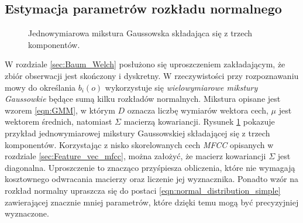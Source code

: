 \documentclass[shortabstract, mgr]{iithesis}
\begin{document}
	   \subsection{Estymacja parametrów rozkładu normalnego}
	   	   
	   \begin{figure}[H]
		   \centering
		   \label{fig:gmm}
		   \caption{Jednowymiarowa mikstura Gaussowska składająca się z trzech komponentów.}
	\end{figure}
	   
	   \label{sec:gmm_estimation}
	   W rozdziale \ref{sec:Baum_Welch} posłużono się uproszczeniem zakładającym, że zbiór obserwacji jest skończony i dyskretny. W rzeczywistości przy rozpoznawaniu mowy do określania $b_i(o)$ wykorzystuje się \textit{wielowymiarowe mikstury Gaussowkie} będące sumą kilku rozkładów normalnych. Mikstura opisane jest wzorem \ref{eqn:GMM}, w którym $D$ oznacza liczbę wymiarów wektora cech, $\mu$ jest wektorem średnich, natomiast $\Sigma$ macierzą kowariancji. Rysunek \ref{fig:gmm} pokazuje przykład jednowymiarowej mikstury Gaussowskiej składającej się z trzech komponentów. Korzystając z nisko skorelowanych cech \textit{MFCC} opisanych w rozdziale \ref{sec:Feature_vec_mfcc}, można założyć, że macierz kowariancji $\Sigma$ jest diagonalna. Uproszczenie to znacząco przyśpiesza obliczenia, które nie wymagają kosztownego odwracania macierzy oraz liczenie jej wyznacznika. Ponadto wzór na rozkład normalny upraszcza się do postaci \ref{eqn:normal_distribution_simple} zawierającej znacznie mniej parametrów, które dzięki temu mogą być precyzyjniej wyznaczone.
	   
\end{document}
